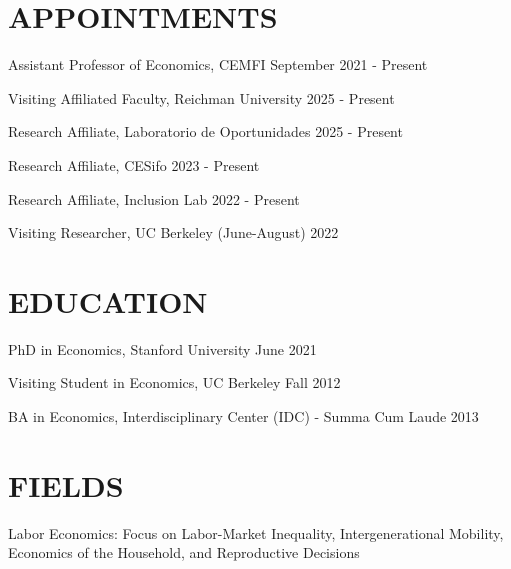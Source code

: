 \documentclass[margin]{res} %
\begin{document}
\begin{resume}


\section{APPOINTMENTS}

Assistant Professor of Economics, CEMFI \hfill September 2021 - Present

Visiting Affiliated Faculty, Reichman University \hfill 2025 - Present

Research Affiliate, Laboratorio de Oportunidades \hfill 2025 - Present

Research Affiliate, CESifo \hfill 2023 - Present

Research Affiliate, Inclusion Lab \hfill 2022 - Present

Visiting Researcher, UC Berkeley (June-August) \hfill 2022


\section{EDUCATION}

PhD in Economics, Stanford University \hfill June 2021

Visiting Student in Economics, UC Berkeley  \hfill Fall 2012 

BA in Economics, Interdisciplinary Center (IDC) - Summa Cum Laude \hfill 2013

 
\section{FIELDS}  
 Labor Economics: Focus on Labor-Market Inequality, Intergenerational Mobility, Economics of the Household, and Reproductive Decisions
 



\end{resume}
\end{document}
